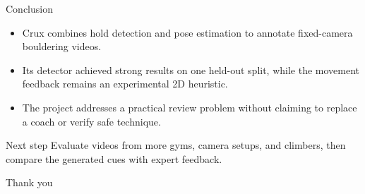 \documentclass[aspectratio=169]{beamer}
\begin{document}
\begin{frame}{Conclusion}
  \begin{itemize}
    \item Crux combines hold detection and pose estimation to annotate
      fixed-camera bouldering videos.
    \item Its detector achieved strong results on one held-out split, while
      the movement feedback remains an experimental 2D heuristic.
    \item The project addresses a practical review problem without claiming
      to replace a coach or verify safe technique.
  \end{itemize}
  \vspace{0.7em}
  \begin{block}{Next step}
    Evaluate videos from more gyms, camera setups, and climbers, then compare
    the generated cues with expert feedback.
  \end{block}
  \centering
  \vspace{0.5em}
  \Large Thank you
\end{frame}
\end{document}

